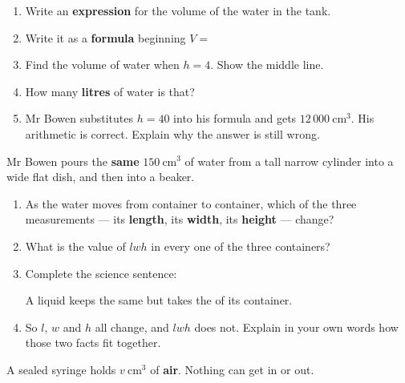 \documentclass[12pt,a4paper]{article}
\newcommand{\qlines}[1]{\par\needspace{\numexpr#1+1\relax\baselineskip}\wlines{#1}}
\begin{document}
\vspace{4pt}
\begin{enumerate}[label=(\alph*), itemsep=10pt]
  \item Write an \textbf{expression} for the volume of the water in the tank.
        \hfill \blank[3.4cm]
  \item Write it as a \textbf{formula} beginning $V = $ \hfill \blank[3.4cm]
  \item Find the volume of water when $h = 4$. Show the middle line.
        \hfill \blank[5.0cm]
  \item How many \textbf{litres} of water is that? \hfill \blank[3.4cm]
  \item Mr Bowen substitutes $h = 40$ into his formula and gets
        $12\,000\ \mathrm{cm^3}$. His arithmetic is correct. Explain why the answer
        is still wrong.
\end{enumerate}
\qlines{2}


\noindent Mr Bowen pours the \textbf{same} $150\ \mathrm{cm^3}$ of water from a tall
narrow cylinder into a wide flat dish, and then into a beaker.

\vspace{5pt}
\begin{enumerate}[label=(\alph*), itemsep=10pt]
  \item As the water moves from container to container, which of the three
        measurements --- its \textbf{length}, its \textbf{width}, its
        \textbf{height} --- change? \hfill \blank[4.4cm]
  \item What is the value of $lwh$ in every one of the three containers?
        \hfill \blank[4.4cm]
  \item Complete the science sentence:

        \smallskip
        A liquid keeps the same \blank[3.4cm] but takes the \blank[3.4cm] of its
        container.
  \item So $l$, $w$ and $h$ all change, and $lwh$ does not. Explain in your own
        words how those two facts fit together.
\end{enumerate}
\qlines{2}


\noindent A sealed syringe holds $v\ \mathrm{cm^3}$ of \textbf{air}. Nothing can get in
or out.
\end{document}
